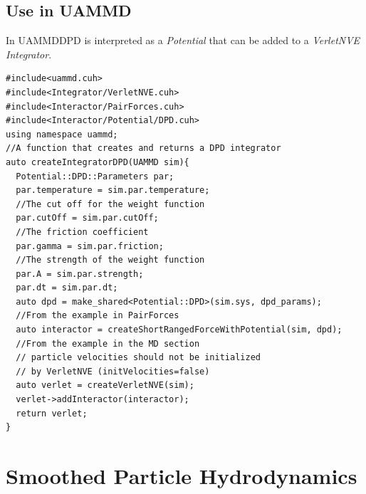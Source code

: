 \documentclass[ twoside,openright,titlepage,numbers=noenddot,%
headinclude,footinclude,cleardoublepage=empty,abstract=on,
BCOR=5mm,paper=a4,fontsize=11pt, dvipsnames
]{scrreprt}
\def\ucpp{uammd_cpp_lexer.py:UAMMDCppLexer -x}
\newcommand{\uammd}{\gls{UAMMD}\xspace}
\begin{document}
\subsection*{Use in UAMMD}
In \uammd \gls{DPD} is interpreted as a \emph{Potential} that can be added to a \emph{VerletNVE} \emph{Integrator}.

\begin{verbatim}
#include<uammd.cuh>
#include<Integrator/VerletNVE.cuh>
#include<Interactor/PairForces.cuh>
#include<Interactor/Potential/DPD.cuh>
using namespace uammd;
//A function that creates and returns a DPD integrator
auto createIntegratorDPD(UAMMD sim){   
  Potential::DPD::Parameters par;
  par.temperature = sim.par.temperature;
  //The cut off for the weight function
  par.cutOff = sim.par.cutOff;
  //The friction coefficient
  par.gamma = sim.par.friction; 
  //The strength of the weight function
  par.A = sim.par.strength; 
  par.dt = sim.par.dt;  
  auto dpd = make_shared<Potential::DPD>(sim.sys, dpd_params);
  //From the example in PairForces
  auto interactor = createShortRangedForceWithPotential(sim, dpd);
  //From the example in the MD section
  // particle velocities should not be initialized
  // by VerletNVE (initVelocities=false)
  auto verlet = createVerletNVE(sim);
  verlet->addInteractor(interactor);
  return verlet;
}
\end{verbatim}


\section{Smoothed Particle Hydrodynamics}
\end{document}
